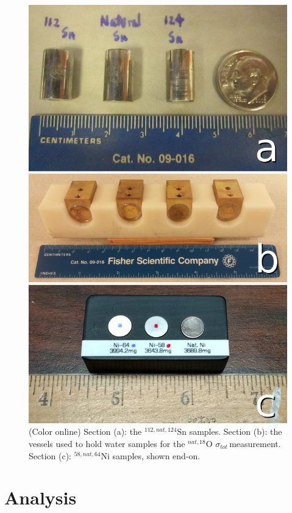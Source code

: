 \documentclass[twocolumn,secnumarabic,amssymb, nobibnotes, aps, prl,
superscriptaddress, nobalancelastpage]{revtex4}
\newcommand{\tots}{\ensuremath{\sigma_{tot}}\,}
\begin{document}
\begin{figure}
    \includegraphics[scale=0.23]{figures/AllIsotopicSamples.jpg}
    \caption{(Color online) Section (a): the ${^{112,nat,124}}$Sn samples. Section (b): the 
        vessels used to hold water samples for the ${^{nat, 18}}$O \tots measurement. 
        Section (c): ${^{58,nat,64}}$Ni samples, shown end-on.}
    \label{SamplesImage}
\end{figure}

\section{Analysis}
\end{document}
